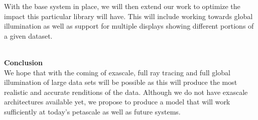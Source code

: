 \documentclass[12pt]{article}
\begin{document}
With the base system in place, we will then extend our work to optimize the impact this particular library will have.  This will include working towards global illumination as well as support for multiple displays showing different portions of a given dataset.

\textbf {\\ Conclusion} \\

We hope that with the coming of exascale, full ray tracing and full global illumination of large data sets will be possible as this will produce the most realistic and accurate renditions of the data.  Although we do not have exascale architectures available yet, we propose to produce a model that will work sufficiently at today’s petascale as well as future systems.
\end{document}
